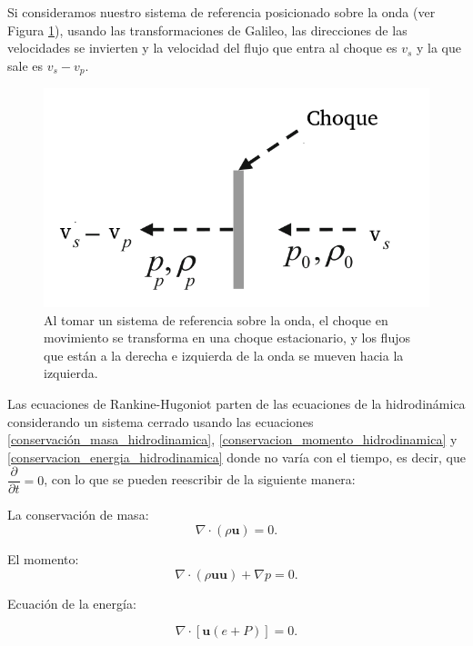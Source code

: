 \documentclass[12pt,a4paper]{book}
\begin{document}
Si consideramos nuestro sistema de referencia posicionado sobre la onda (ver Figura \ref{fig:choque:estacionario}), usando las transformaciones de Galileo, las direcciones de las velocidades
se invierten y la velocidad del flujo que entra al choque es $v_s$ y la que sale es $v_s-v_p$.

\begin{figure} 
  \centering
  \includegraphics[scale=0.7]{./Figuras/Teoria/stationary_shock.png}
  \caption{Al tomar un sistema de referencia sobre la onda, el choque en movimiento se transforma en una choque estacionario, y los
  flujos que están a la derecha e izquierda de la onda se mueven hacia la izquierda.} \label{fig:choque:estacionario}
\end{figure}

Las ecuaciones de Rankine-Hugoniot parten de las ecuaciones de la hidrodinámica considerando un sistema cerrado usando las ecuaciones \ref{conservación_masa_hidrodinamica}, 
\ref{conservacion_momento_hidrodinamica} y \ref{conservacion_energia_hidrodinamica} donde no varía con el tiempo, es decir, que $\dfrac{\partial}{\partial t}=0$, con lo que se pueden reescribir de la siguiente manera:


\noindent La conservación de masa:
\begin{equation}
  \nabla \cdot \left( \rho \mathbf{u} \right)=0.
\end{equation}

\noindent El momento:
\begin{equation}
  \nabla \cdot \left( \rho \mathbf{u u} \right) + \nabla p = 0.
\end{equation}

\noindent Ecuación de la energía:

\begin{equation}
 \nabla \cdot \left[ \mathbf{u} \left( e+P \right) \right] = 0.
\end{equation}
\end{document}
